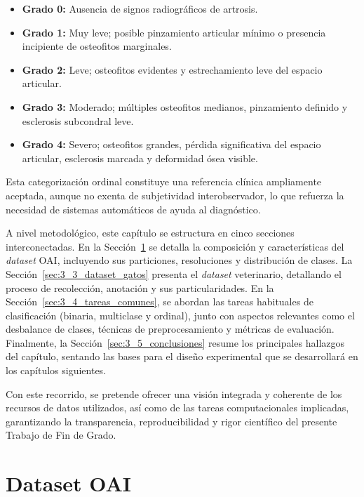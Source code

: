 \documentclass[11pt,spanish,listoffigures,listoftables]{tfgetsinf}
\begin{document}
\begin{itemize}
    \item \textbf{Grado 0:} Ausencia de signos radiográficos de artrosis.
    \item \textbf{Grado 1:} Muy leve; posible pinzamiento articular mínimo o presencia incipiente de osteofitos marginales.
    \item \textbf{Grado 2:} Leve; osteofitos evidentes y estrechamiento leve del espacio articular.
    \item \textbf{Grado 3:} Moderado; múltiples osteofitos medianos, pinzamiento definido y esclerosis subcondral leve.
    \item \textbf{Grado 4:} Severo; osteofitos grandes, pérdida significativa del espacio articular, esclerosis marcada y deformidad ósea visible.
\end{itemize}

Esta categorización ordinal constituye una referencia clínica ampliamente aceptada, aunque no exenta de subjetividad interobservador, lo que refuerza la necesidad de sistemas automáticos de ayuda al diagnóstico. 

A nivel metodológico, este capítulo se estructura en cinco secciones interconectadas. En la Sección~\ref{sec:3_2_dataset_oai} se detalla la composición y características del \textit{dataset} OAI, incluyendo sus particiones, resoluciones y distribución de clases. La Sección~\ref{sec:3_3_dataset_gatos} presenta el \textit{dataset} veterinario, detallando el proceso de recolección, anotación y sus particularidades. En la Sección~\ref{sec:3_4_tareas_comunes}, se abordan las tareas habituales de clasificación (binaria, multiclase y ordinal), junto con aspectos relevantes como el desbalance de clases, técnicas de preprocesamiento y métricas de evaluación. Finalmente, la Sección~\ref{sec:3_5_conclusiones} resume los principales hallazgos del capítulo, sentando las bases para el diseño experimental que se desarrollará en los capítulos siguientes.

Con este recorrido, se pretende ofrecer una visión integrada y coherente de los recursos de datos utilizados, así como de las tareas computacionales implicadas, garantizando la transparencia, reproducibilidad y rigor científico del presente Trabajo de Fin de Grado.

\section{Dataset OAI}
\label{sec:3_2_dataset_oai}
\end{document}
